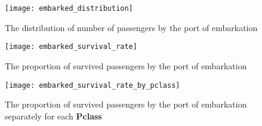 \begin{figure}[!hp]
    \centering
    \texttt{[image: embarked\_distribution]}
    \caption{The distribution of number of passengers by the port of embarkation}
    \label{pic:embarked_distribution}
\end{figure}

\begin{figure}[!hp]
    \centering
    \texttt{[image: embarked\_survival\_rate]}
    \caption{The proportion of survived passengers by the port of embarkation}
    \label{pic:embarked_survival_rate}
\end{figure}

\begin{figure}[!hp]
    \centering
    \texttt{[image: embarked\_survival\_rate\_by\_pclass]}
    \caption{The proportion of survived passengers by the port of embarkation separately for each \textbf{Pclass}}
    \label{pic:embarked_survival_rate_by_pclass}
\end{figure}